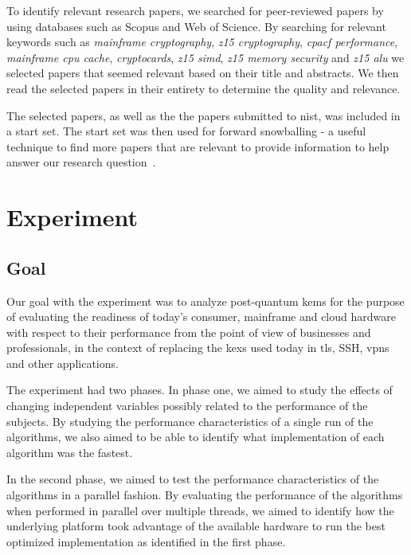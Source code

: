 To identify relevant research papers, we searched for peer-reviewed papers by using databases such as Scopus and Web of Science. By searching for relevant keywords such as \textit{mainframe cryptography}, \textit{z15 cryptography}, \textit{cpacf performance}, \textit{mainframe cpu cache}, \textit{cryptocards}, \textit{z15 simd}, \textit{z15 memory security} and \textit{z15 alu} we selected papers that seemed relevant based on their title and abstracts. We then read the selected papers in their entirety to determine the quality and relevance.

The selected papers, as well as the the papers submitted to \gls{nist}, was included in a start set. The start set was then used for forward snowballing - a useful technique to find more papers that are relevant to provide information to help answer our research question~\cite{wohlin2014}.

\section{Experiment}
\label{section:method:experiment}

\subsection{Goal}
\label{section:method:experiment:goal}

Our goal with the experiment was to analyze \gls{post-quantum} \glspl{kem} for the purpose of evaluating the readiness of today's consumer, mainframe and cloud hardware with respect to their performance from the point of view of businesses and professionals, in the context of replacing the \glspl{kex} used today in \gls{tls}, SSH, \glspl{vpn} and other applications.

The experiment had two phases. In phase one, we aimed to study the effects of changing independent variables possibly related to the performance of the subjects. By studying the performance characteristics of a single run of the algorithms, we also aimed to be able to identify what implementation of each algorithm was the fastest.

In the second phase, we aimed to test the performance characteristics of the algorithms in a parallel fashion. By evaluating the performance of the algorithms when performed in parallel over multiple threads, we aimed to identify how the underlying platform took advantage of the available hardware to run the best optimized implementation as identified in the first phase.

